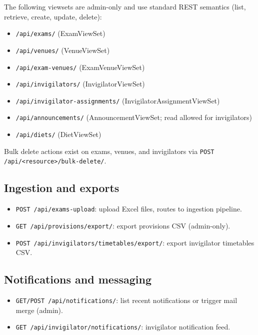 The following viewsets are admin-only and use standard REST semantics (list, retrieve, create, update, delete):

\begin{itemize}
  \item \texttt{/api/exams/} (ExamViewSet)
  \item \texttt{/api/venues/} (VenueViewSet)
  \item \texttt{/api/exam-venues/} (ExamVenueViewSet)
  \item \texttt{/api/invigilators/} (InvigilatorViewSet)
  \item \texttt{/api/invigilator-assignments/} (InvigilatorAssignmentViewSet)
  \item \texttt{/api/announcements/} (AnnouncementViewSet; read allowed for invigilators)
  \item \texttt{/api/diets/} (DietViewSet)
\end{itemize}

Bulk delete actions exist on exams, venues, and invigilators via \texttt{POST /api/<resource>/bulk-delete/}.

\subsection{Ingestion and exports}
\label{subsec:api:ingest}

\begin{itemize}
  \item \texttt{POST /api/exams-upload}: upload Excel files, routes to ingestion pipeline.
  \item \texttt{GET /api/provisions/export/}: export provisions CSV (admin-only).
  \item \texttt{POST /api/invigilators/timetables/export/}: export invigilator timetables CSV.
\end{itemize}

\subsection{Notifications and messaging}
\label{subsec:api:notifications}

\begin{itemize}
  \item \texttt{GET/POST /api/notifications/}: list recent notifications or trigger mail merge (admin).
  \item \texttt{GET /api/invigilator/notifications/}: invigilator notification feed.
\end{itemize}

